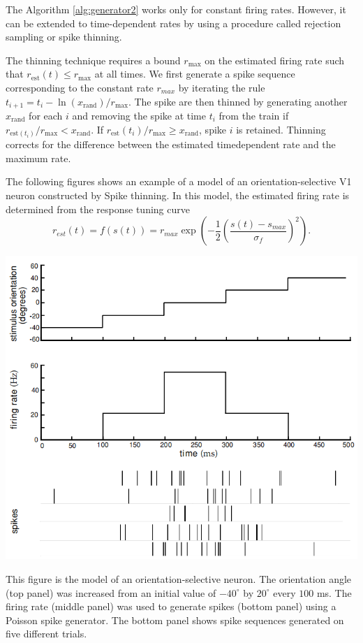 \begin{rem}
  The Algorithm \ref{alg:generator2} works only for constant firing rates. However, it can be extended to time-dependent rates by using a procedure called rejection sampling or spike thinning.
\end{rem}

\begin{alg}
  The thinning technique requires a bound $r_\text{max}$ on the estimated firing rate such that $r_{\text{est}}(t) \leq r_\text{max}$    at all times. We first generate a spike sequence corresponding to the constant rate $r_{max}$ by iterating the rule $t_{i+1} = t_i - \ln(x_{\text{rand}})/r_\text{max}$. The spike are then thinned by generating another $x_{\text{rand}}$ for each $i$ and removing the spike at time $t_i$ from the train if $r_{\text{est}(t_i)}/r_{\text{max}} < x_{\text{rand}}$. If $r_\text{est}(t_i) / r_{\text{max}} \geq x_{\text{rand}}$, spike $i$ is retained. Thinning corrects for the difference between the estimated timedependent rate and the maximum rate.
\end{alg} 

\begin{exm}
  The following figures shows an example of a model of an orientation-selective V1 neuron constructed by  Spike thinning. In this model,  the estimated firing rate is determined from the response tuning curve
  \begin{equation}
    r_{est}(t)=f(s(t))=r_{max}\exp\left(-\frac{1}{2}\left(\frac{s(t)-s_{max}}{\sigma_f}\right)^2\right).
    \label{equ:1.38}
  \end{equation}
  \begin{center}
    \label{fig:1.13}    
    \includegraphics[scale = 0.29]{png/Fig_1_13.png}
  \end{center}
  This figure is the model of an orientation-selective neuron. The orientation angle (top panel) was increased from an initial value of $-40^\circ$  by $20^\circ $  every $100$ ms. The firing rate (middle panel) was used to generate spikes (bottom panel) using a Poisson spike generator. The bottom panel shows spike sequences generated on five different trials.
\end{exm}

